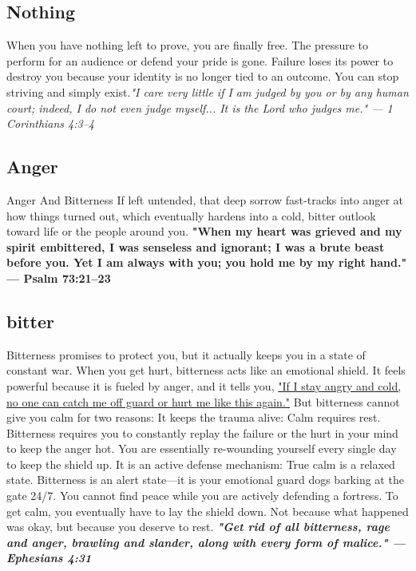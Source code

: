 \documentclass{article}%
\begin{document}
\subsection{Nothing}
\footnotesize
When you have nothing left to prove, you are finally free. The pressure to perform for an audience or defend your pride is gone. Failure loses its power to destroy you because your identity is no longer tied to an outcome. You can stop striving and simply exist.\small \textit{"I care very little if I am judged by you or by any human court; indeed, I do not even judge myself... It is the Lord who judges me."
— 1 Corinthians 4:3–4}

\subsection{Anger}
Anger And Bitterness
If left untended, that deep sorrow fast-tracks into anger at how things turned out, which eventually hardens into a cold, bitter outlook toward life or the people around you.
\textbf{"When my heart was grieved and my spirit embittered, I was senseless and ignorant; I was a brute beast before you. Yet I am always with you; you hold me by my right hand."
— Psalm 73:21–23}

\subsection{bitter}
Bitterness promises to protect you, but it actually keeps you in a state of constant war.
When you get hurt, bitterness acts like an emotional shield. It feels powerful because it is fueled by anger, and it tells you, \underline{"If I stay angry and cold, no one can catch me off guard or hurt me like this again."}
But bitterness cannot give you calm for two reasons:
It keeps the trauma alive: Calm requires rest. Bitterness requires you to constantly replay the failure or the hurt in your mind to keep the anger hot. You are essentially re-wounding yourself every single day to keep the shield up.
It is an active defense mechanism: True calm is a relaxed state. Bitterness is an alert state—it is your emotional guard dogs barking at the gate 24/7. You cannot find peace while you are actively defending a fortress.
To get calm, you eventually have to lay the shield down. Not because what happened was okay, but because you deserve to rest. \large \textbf{\textit{"Get rid of all bitterness, rage and anger, brawling and slander, along with every form of malice."
— Ephesians 4:31}}
\end{document}
